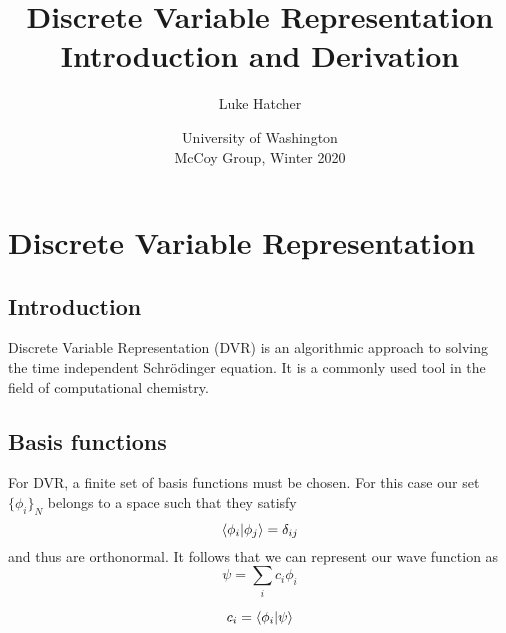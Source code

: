 \documentclass[12pt]{article}
\begin{document}
\title{Discrete Variable Representation Introduction and Derivation}
\author{Luke Hatcher}
\date{University of Washington \\ McCoy Group, Winter 2020}
\maketitle


\section{Discrete Variable Representation}
\subsection{Introduction}
Discrete Variable Representation (DVR) is an algorithmic approach to solving the time independent Schr{\"o}dinger equation. It is a commonly used tool in the field of computational chemistry. 
\subsection{Basis functions}
For DVR, a finite set of basis functions must be chosen. 
For this case our set $\{\phi_i\}_N$ belongs to a space such that they satisfy
\begin{equation}
\braket{\phi_i|\phi_j} = \delta_{ij}
\end{equation}
and thus are orthonormal.  
It follows that we can represent our wave function as
\begin{equation}
\psi=\sum_i{c_i}\phi_i
\end{equation}

\begin{equation}
c_i = \braket{\phi_i|\psi}
\end{equation}
\end{document}

